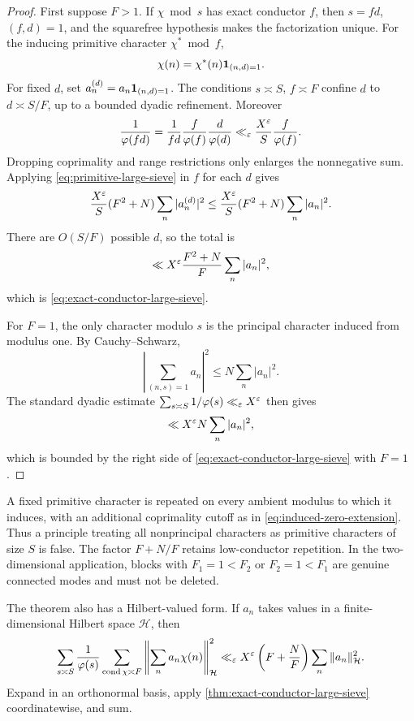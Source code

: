 \begin{proof}
First suppose \(F>1\).  If \(\chi\bmod s\) has exact conductor \(f\),
then \(s=fd\), \((f,d)=1\), and the squarefree hypothesis makes the
factorization unique.  For the inducing primitive character
\(\chi^*\bmod f\),
\begin{equation}
 \chi(n)=\chi^*(n)\mathbf 1_{(n,d)=1}.
 \label{eq:induced-zero-extension}
\end{equation}
For fixed \(d\), set \(a_n^{(d)}=a_n\mathbf 1_{(n,d)=1}\).  The conditions
\(s\asymp S\), \(f\asymp F\) confine \(d\) to
\(d\asymp S/F\), up to a bounded dyadic refinement.  Moreover
\begin{equation}
 \frac1{\varphi(fd)}
 =\frac1{fd}\frac f{\varphi(f)}\frac d{\varphi(d)}
 \ll_\varepsilon \frac{X^\varepsilon}{S}\frac f{\varphi(f)}.
 \label{eq:exact-conductor-weight}
\end{equation}
Dropping coprimality and range restrictions only enlarges the
nonnegative sum.  Applying \eqref{eq:primitive-large-sieve} in \(f\)
for each \(d\) gives
\[
 \frac{X^\varepsilon}{S}(F^2+N)\sum_n|a_n^{(d)}|^2
 \le \frac{X^\varepsilon}{S}(F^2+N)\sum_n|a_n|^2.
\]
There are \(O(S/F)\) possible \(d\), so the total is
\[
 \ll X^\varepsilon \frac{F^2+N}{F}\sum_n|a_n|^2,
\]
which is \eqref{eq:exact-conductor-large-sieve}.

For \(F=1\), the only character modulo \(s\) is the principal character
induced from modulus one.  By Cauchy--Schwarz,
\[
 \left|\sum_{(n,s)=1}a_n\right|^2
 \le N\sum_n|a_n|^2.
\]
The standard dyadic estimate
\(\sum_{s\asymp S}1/\varphi(s)\ll_\varepsilon X^\varepsilon\) then gives
\[
 \ll X^\varepsilon N\sum_n|a_n|^2,
\]
which is bounded by the right side of
\eqref{eq:exact-conductor-large-sieve} with \(F=1\).
\end{proof}

\begin{remark}
\label{rem:conductor-one}
A fixed primitive character is repeated on every ambient modulus to
which it induces, with an additional coprimality cutoff as in
\eqref{eq:induced-zero-extension}.  Thus a principle treating all
nonprincipal characters as primitive characters of size \(S\) is
false.  The factor \(F+N/F\) retains low-conductor repetition.  In the
two-dimensional application, blocks with \(F_1=1<F_2\) or
\(F_2=1<F_1\) are genuine connected modes and must not be deleted.
\end{remark}

The theorem also has a Hilbert-valued form.  If \(a_n\) takes values in
a finite-dimensional Hilbert space \(\mathcal H\), then
\begin{equation}
 \sum_{s\asymp S}\frac1{\varphi(s)}
 \sum_{\operatorname{cond}\chi\asymp F}
 \left\|\sum_na_n\chi(n)\right\|_{\mathcal H}^2
 \ll_\varepsilon X^\varepsilon\left(F+\frac NF\right)
 \sum_n\|a_n\|_{\mathcal H}^2.
 \label{eq:Hilbert-exact-conductor}
\end{equation}
Expand in an orthonormal basis, apply
\cref{thm:exact-conductor-large-sieve} coordinatewise, and sum.
